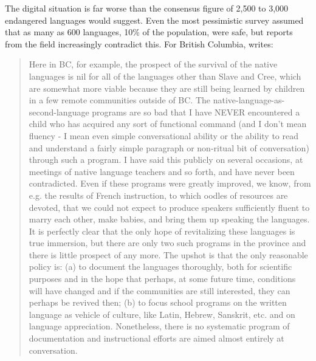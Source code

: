 \documentclass[10pt]{article}
\begin{document}
The {\color{black} digital} situation is far worse than the consensus figure of
2,500 to 3,000 endangered languages would suggest. Even the most pessimistic
survey \cite{Krauss:1992}
assumed that as many as 600 languages, 10\% of the population, were
safe, but reports from the field increasingly contradict this. For British 
Columbia, \cite{Poser:pc} writes:

\begin{quote}
Here in BC, for example, the prospect of the survival of the native languages
is nil for all of the languages other than Slave and Cree, which are somewhat
more viable because they are still being learned by children in a few remote
communities outside of BC. The native-language-as-second-language programs are
so bad that I have NEVER encountered a child who has acquired any sort of
functional command (and I don't mean fluency - I mean even simple
conversational ability or the ability to read and understand a fairly simple
paragraph or non-ritual bit of conversation) through such a program. I have
said this publicly on several occasions, at meetings of native language
teachers and so forth, and have never been contradicted. Even if these
programs were greatly improved, we know, from e.g. the results of French
instruction, to which oodles of resources are devoted, that we could not
expect to produce speakers sufficiently fluent to marry each other, make
babies, and bring them up speaking the languages. It is perfectly clear that
the only hope of revitalizing these languages is true immersion, but there are
only two such programs in the province and there is little prospect of any
more.  The upshot is that the only reasonable policy is: (a) to document the
languages thoroughly, both for scientific purposes and in the hope that
perhaps, at some future time, conditions will have changed and if the
communities are still interested, they can perhaps be revived then; (b) to
focus school programs on the written language as vehicle of culture, like
Latin, Hebrew, Sanskrit, etc. and on language appreciation. Nonetheless, there
is no systematic program of documentation and instructional efforts are aimed
almost entirely at conversation.
\end{quote}
\end{document}
